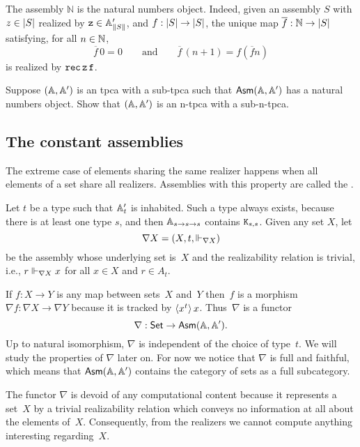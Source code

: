 The assembly $\mathbb{N}$ is the natural numbers object. Indeed, given an assembly $S$ with $z \in \S{S}$ realized by $\mathtt{z} \in \subAtyp{\T{S}}$, and $f : \S{S} \to \S{S}$, the unique map $\overline{f} : \mathbb{N} \to \S{S}$ satisfying, for all $n \in \NN$,
%
\begin{equation*}
  \overline{f} \, 0 = 0
  \qquad\text{and}\qquad
  \overline{f} \, (n + 1) = f (\overline{f} n)
\end{equation*}
%
is realized by $\combRec \, \mathtt{z} \, \mathtt{f}$.

\begin{exercise}
  Suppose $(\AA, \subAA)$ is an tpca with a sub-tpca such that $\AsmA$ has a natural numbers object. Show that $(\AA, \subAA)$ is an n-tpca with a sub-n-tpca.
\end{exercise}


\subsection{The constant assemblies}
\label{sec:nabla}

The extreme case of elements sharing the same realizer happens when
all elements of a set share all realizers. Assemblies with this
property are called the .

Let $t$ be a type such that $\subAtyp{t}$ is inhabited. Such a type
always exists, because there is at least one type $s$, and then
$\Atyp{s \to s \to s}$ contains $\combK_{s,s}$. Given any set $X$, let
%
\begin{equation*}
  \nabla X = (X, t, {\rz[\nabla X]})
\end{equation*}
%
be the assembly whose underlying set is~$X$ and the realizability relation is trivial, i.e., $r \rz[\nabla X] x$ for all $x \in X$ and $r \in A_t$.

If $f : X \to Y$ is any map between sets~$X$ and~$Y$ then~$f$ is a morphism $\nabla f : \nabla X \to \nabla Y$ because it is tracked by $\tpcalam{x}{t}{x}$. Thus~$\nabla$ is a functor
%
\begin{equation*}
  \nabla : \Set \to \AsmA.
\end{equation*}
%
Up to natural isomorphism, $\nabla$ is independent of the choice of
type~$t$. We will study the properties of $\nabla$ later on. For now
we notice that $\nabla$ is full and faithful, which means that
$\AsmA$ contains the category of sets as a full
subcategory.

The functor $\nabla$ is devoid of any computational content because it
represents a set~$X$ by a trivial realizability relation which conveys
no information at all about the elements of~$X$. Consequently, from
the realizers we cannot compute anything interesting regarding~$X$.

